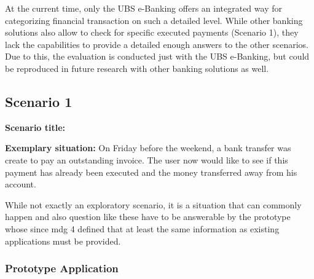 At the current time, only the UBS e-Banking offers an integrated way for categorizing financial transaction on such a detailed level. While other banking solutions also allow to check for specific executed payments (Scenario 1), they lack the capabilities to provide a detailed enough answers to the other scenarios. Due to this, the evaluation is conducted just with the UBS e-Banking, but could be reproduced in future research with other banking solutions as well.


\subsection{Scenario 1}

\textbf{Scenario title:} \scenone

\textbf{Exemplary situation:} On Friday before the weekend, a bank transfer was create to pay an outstanding invoice. The user now would like to see if this payment has already been executed and the money transferred away from his account. 

While not exactly an exploratory scenario, it is a situation that can commonly happen and also question like these have to be answerable by the prototype whose since \gls{mdg} 4 defined that at least the same information as existing applications must be provided.


\subsubsection{Prototype Application}

